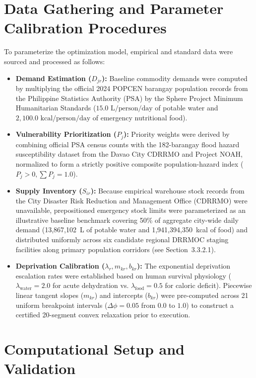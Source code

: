\section{Data Gathering and Parameter Calibration Procedures}
To parameterize the optimization model, empirical and standard data were sourced and processed as follows:
\begin{itemize}
    \item \textbf{Demand Estimation ($D_{jr}$):} Baseline commodity demands were computed by multiplying the official 2024 POPCEN barangay population records from the Philippine Statistics Authority (PSA) by the Sphere Project Minimum Humanitarian Standards ($15.0\text{ L/person/day}$ of potable water and $2{,}100.0\text{ kcal/person/day}$ of emergency nutritional food).
    \item \textbf{Vulnerability Prioritization ($P_j$):} Priority weights were derived by combining official PSA census counts with the 182-barangay flood hazard susceptibility dataset from the Davao City CDRRMO and Project NOAH, normalized to form a strictly positive composite population-hazard index ($P_j > 0, \sum P_j = 1.0$).
    \item \textbf{Supply Inventory ($S_{ir}$):} Because empirical warehouse stock records from the City Disaster Risk Reduction and Management Office (CDRRMO) were unavailable, prepositioned emergency stock limits were parameterized as an illustrative baseline benchmark covering 50\% of aggregate city-wide daily demand (13,867,102~L of potable water and 1,941,394,350~kcal of food) and distributed uniformly across six candidate regional DRRMOC staging facilities along primary population corridors (see Section~3.3.2.1).
    \item \textbf{Deprivation Calibration ($\lambda_r, m_{kr}, b_{kr}$):} The exponential deprivation escalation rates were established based on human survival physiology ($\lambda_{\text{water}} = 2.0$ for acute dehydration vs. $\lambda_{\text{food}} = 0.5$ for caloric deficit). Piecewise linear tangent slopes ($m_{kr}$) and intercepts ($b_{kr}$) were pre-computed across 21 uniform breakpoint intervals ($\Delta \phi = 0.05$ from $0.0$ to $1.0$) to construct a certified 20-segment convex relaxation prior to execution.
\end{itemize}


\section{Computational Setup and Validation}
\label{sec:computational_setup}

